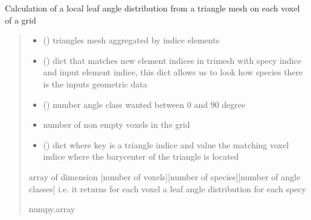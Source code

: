 \documentclass[letterpaper,10pt,english]{sphinxmanual}
\begin{document}
\begin{fulllineitems}
\label{\detokenize{reference:leafangles.compute_distrib_voxel}}
\pysigstartsignatures
{}
\pysigstopsignatures
\sphinxAtStartPar
Calculation of a local leaf angle distribution from a triangle mesh on each voxel of a grid
\begin{quote}\begin{description}
\begin{itemize}
\item {} 
\sphinxAtStartPar
{} () \textendash{} triangles mesh aggregated by indice elements 

\item {} 
\sphinxAtStartPar
{} () \textendash{} dict that matches new element indices in trimesh with specy indice and
input element indice, 
this dict allows us to look how species there is the inputs geometric data

\item {} 
\sphinxAtStartPar
{} () \textendash{} number angle class wanted between 0 and 90 degree

\item {} 
\sphinxAtStartPar
{} \textendash{} number of non empty voxels in the grid

\item {} 
\sphinxAtStartPar
{} () \textendash{} dict where key is a triangle indice and value the matching voxel indice where the
barycenter of the triangle is located

\end{itemize}

\sphinxAtStartPar
array of dimension {[}number of voxels{]}{[}number of species{]}{[}number of angle classes{]}
i.e. it returns for each voxel a leaf angle distribution for each specy

\sphinxAtStartPar
numpy.array

\end{description}\end{quote}

\end{fulllineitems}
\end{document}
